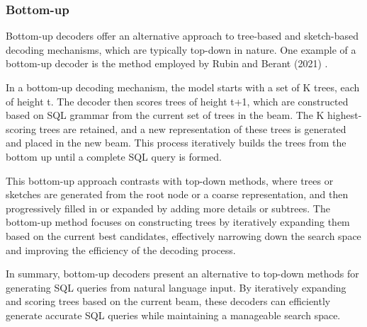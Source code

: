 \subsubsection{Bottom-up}

Bottom-up decoders offer an alternative approach to tree-based and sketch-based decoding mechanisms, which are typically top-down in nature. One example of a bottom-up decoder is the method employed by Rubin and Berant (2021) \cite{rubin-berant-2021-smbop}.

In a bottom-up decoding mechanism, the model starts with a set of K trees, each of height t. The decoder then scores trees of height t+1, which are constructed based on SQL grammar from the current set of trees in the beam. The K highest-scoring trees are retained, and a new representation of these trees is generated and placed in the new beam. This process iteratively builds the trees from the bottom up until a complete SQL query is formed.

This bottom-up approach contrasts with top-down methods, where trees or sketches are generated from the root node or a coarse representation, and then progressively filled in or expanded by adding more details or subtrees. The bottom-up method focuses on constructing trees by iteratively expanding them based on the current best candidates, effectively narrowing down the search space and improving the efficiency of the decoding process.

In summary, bottom-up decoders present an alternative to top-down methods for generating SQL queries from natural language input. By iteratively expanding and scoring trees based on the current beam, these decoders can efficiently generate accurate SQL queries while maintaining a manageable search space.